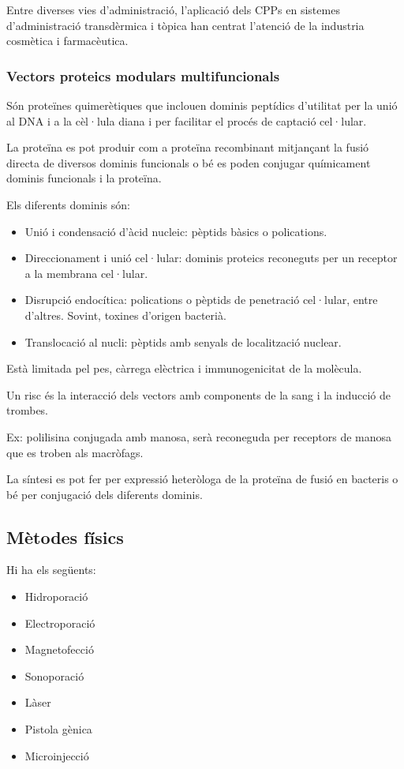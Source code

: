 Entre diverses vies d'administració, l'aplicació dels CPPs en sistemes d'administració transdèrmica i tòpica han centrat l'atenció de la industria cosmètica i farmacèutica.

\subsubsection{Vectors proteics modulars multifuncionals}
\label{sec:vect-prot-modul}
Són proteïnes quimerètiques que inclouen dominis peptídics d'utilitat per la unió al DNA i a la cèl·lula diana i per facilitar el procés de captació cel·lular.

La proteïna es pot produir com a proteïna recombinant mitjançant la fusió directa de diversos dominis funcionals o bé es poden conjugar químicament dominis funcionals i la proteïna.

Els diferents dominis són:
\begin{itemize}
\item Unió i condensació d'àcid nucleic: pèptids bàsics o polications. \item Direccionament i unió cel·lular: dominis proteics reconeguts per un receptor a la membrana cel·lular.
\item Disrupció endocítica: polications o pèptids de penetració cel·lular, entre d'altres. Sovint, toxines d'origen bacterià.
\item Translocació al nucli: pèptids amb senyals de localització nuclear.
\end{itemize}

Està limitada pel pes, càrrega elèctrica i immunogenicitat de la molècula.

Un risc és la interacció dels vectors amb components de la sang i la inducció de trombes.

Ex: polilisina conjugada amb manosa, serà reconeguda per receptors de manosa que es troben als macròfags.

La síntesi es pot fer per expressió heteròloga de la proteïna de fusió en bacteris o bé per conjugació dels diferents dominis.


\subsection{Mètodes físics}
\label{sec:metodes-fisics}

Hi ha els següents:
\begin{itemize}
\item Hidroporació
\item Electroporació
\item Magnetofecció
\item Sonoporació
\item Làser
\item Pistola gènica
\item Microinjecció
\end{itemize}

